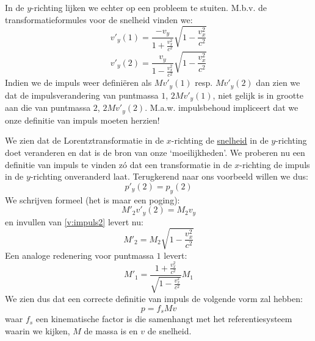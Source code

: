 In de $y$-richting lijken we echter op een probleem te stuiten.
M.b.v. de transformatieformules voor de snelheid vinden we:
\begin{equation}
\label{v:impuls1}
v'_{y}(1) = \frac{-v_{y}}{1 + \frac{v^{2}_{x}}{c^{2}}} \sqrt{1 - \frac{v^{2}_{x}}{c^{2}}}
\end{equation}
\begin{equation}
\label{v:impuls2}
v'_{y}(2) = \frac{v_{y}}{1 - \frac{v^{2}_{x}}{c^{2}}} \sqrt{1 - \frac{v^{2}_{x}}{c^{2}}}
\end{equation}
Indien we de impuls weer defini\"{e}ren als $Mv'_{y}(1)$ resp. $Mv'_{y}(2)$
dan zien we dat de impulsverandering van puntmassa $1$, $2Mv'_{y}(1)$, niet 
gelijk is in grootte aan die van puntmassa $2$, $2Mv'_{y}(2)$.
M.a.w. impulsbehoud impliceert dat we onze definitie van impuls moeten herzien!

We zien dat de Lorentztransformatie in de $x$-richting de \underline{snelheid}
in de $y$-richting doet veranderen en dat is de bron van onze `moeilijkheden'.
We proberen nu een definitie van impuls te vinden z\'{o} dat een transformatie
in de $x$-richting de impuls in de $y$-richting onveranderd laat.
Terugkerend naar ons voorbeeld willen we dus:
\begin{displaymath}
p'_{y}(2) = p_{y}(2)
\end{displaymath}
We schrijven formeel (het is maar een poging):
\begin{displaymath}
M'_{2}v'_{y}(2) = M_{2}v_{y}
\end{displaymath}
en invullen van \ref{v:impuls2} levert nu:
\begin{equation}
\label{v:impuls3}
M'_{2} = M_{2} \sqrt{1 - \frac{v^{2}_{x}}{c^{2}} }
\end{equation}
Een analoge redenering voor puntmassa $1$ levert:
\begin{equation}
\label{v:impuls4}
M'_{1} =  \frac{1 + \frac{v^{2}_{x}}{c^{2}}} {\sqrt{1 - \frac{v^{2}_{x}}{c^{2}}}} M_{1}
\end{equation}
We zien dus dat een correcte definitie van impuls de volgende vorm zal hebben:
\begin{displaymath}
p = f_{s}Mv
\end{displaymath}
waar $f_{s}$ een kinematische factor is die samenhangt met het referentiesysteem waarin we kijken, $M$ de massa is en $v$ de snelheid.

